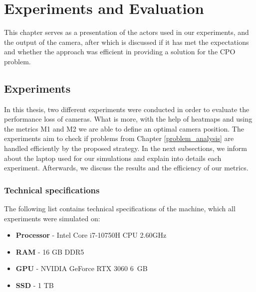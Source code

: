 \chapter{Experiments and Evaluation}
\label{evaluation}

This chapter serves as a presentation of the actors used in our experiments, and the output of the camera, after which is discussed if it has met the expectations and whether the approach was efficient in providing a solution for the CPO problem.

\section{Experiments}
In this thesis, two different experiments were conducted in order to evaluate the performance loss of cameras. What is more, with the help of heatmaps and using the metrics M1 and M2 we are able to define an optimal camera position. The experiments aim to check if problems from Chapter \ref{problem_analysis} are handled efficiently by the proposed strategy. In the next subsections, we inform about the laptop used for our simulations and explain into details each experiment. Afterwards, we discuss the results and the efficiency of our metrics.

\subsection{Technical specifications}
The following list contains technical specifications of the machine, which all experiments were simulated on:
\begin{itemize}
    \item \textbf{Processor} - Intel Core i7-10750H CPU 2.60GHz
    \item \textbf{RAM} - 16 GB DDR5
    \item \textbf{GPU} - NVIDIA GeForce RTX 3060 6 GB
    \item \textbf{SSD} - 1 TB
\end{itemize}

\newpage
